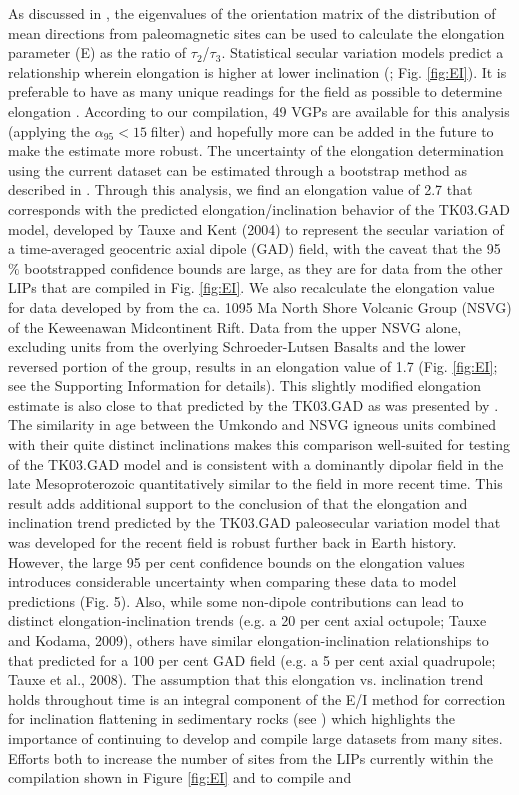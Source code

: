 \documentclass[11pt,letterpaper]{article}
\begin{document}
As discussed in \cite{Tauxe2004a}, the eigenvalues of the orientation matrix of the distribution of mean directions from paleomagnetic sites can be used to calculate the elongation parameter (E) as the ratio of $\tau_2$/$\tau_3$. Statistical secular variation models predict a relationship wherein elongation is higher at lower inclination (\cite{Tauxe2008a}; Fig. \ref{fig:EI}). It is preferable to have as many unique readings for the field as possible to determine elongation \citep{Tauxe2008a}. According to our compilation, 49 VGPs are available for this analysis (applying the $\alpha_{95}<15$\textdegree$\;$filter) and hopefully more can be added in the future to make the estimate more robust. The uncertainty of the elongation determination using the current dataset can be estimated through a bootstrap method as described in \cite{Tauxe2008a}. Through this analysis, we find an elongation value of 2.7 that corresponds with the predicted elongation/inclination behavior of the TK03.GAD model, developed by Tauxe and Kent (2004) to represent the secular variation of a time-averaged geocentric axial dipole (GAD) field, with the caveat that the 95$\%$ bootstrapped confidence bounds are large, as they are for data from the other LIPs that are compiled in Fig. \ref{fig:EI}. We also recalculate the elongation value for data developed by \cite{Tauxe2009a} from the ca. 1095 Ma North Shore Volcanic Group (NSVG) of the Keweenawan Midcontinent Rift. Data from the upper NSVG alone, excluding units from the overlying Schroeder-Lutsen Basalts and the lower reversed portion of the group, results in an elongation value of 1.7 (Fig. \ref{fig:EI}; see the Supporting Information for details). This slightly modified elongation estimate is also close to that predicted by the TK03.GAD as was presented by \cite{Tauxe2009a}. The similarity in age between the Umkondo and NSVG igneous units combined with their quite distinct inclinations makes this comparison well-suited for testing of the TK03.GAD model and is consistent with a dominantly dipolar field in the late Mesoproterozoic quantitatively similar to the field in more recent time. This result adds additional support to the conclusion of \cite{Tauxe2009a} that the elongation and inclination trend predicted by the TK03.GAD paleosecular variation model that was developed for the recent field is robust further back in Earth history. However, the large 95 per cent confidence bounds on the elongation values introduces considerable uncertainty when comparing these data to model predictions (Fig. 5). Also, while some non-dipole contributions can lead to distinct elongation-inclination trends (e.g. a 20 per cent axial octupole; Tauxe and Kodama, 2009), others have similar elongation-inclination relationships to that predicted for a 100 per cent GAD field (e.g. a 5 per cent axial quadrupole; Tauxe et al., 2008). The assumption that this elongation vs. inclination trend holds throughout time is an integral component of the E/I method for correction for inclination flattening in sedimentary rocks (see \citealt{Tauxe2008a}) which highlights the importance of continuing to develop and compile large datasets from many sites. Efforts both to increase the number of sites from the LIPs currently within the compilation shown in Figure \ref{fig:EI} and to compile and 
\end{document}
